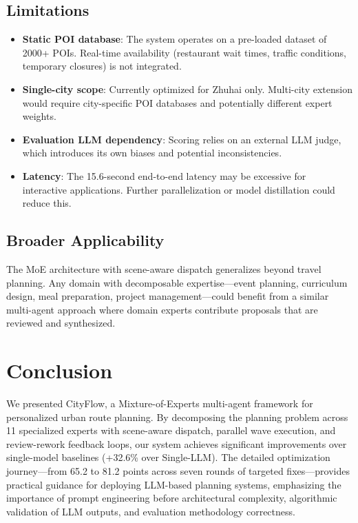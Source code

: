 \documentclass[11pt]{article}
\begin{document}
\subsection{Limitations}

\begin{itemize}[leftmargin=*]
    \item \textbf{Static POI database}: The system operates on a pre-loaded dataset of 2000+ POIs. Real-time availability (restaurant wait times, traffic conditions, temporary closures) is not integrated.
    \item \textbf{Single-city scope}: Currently optimized for Zhuhai only. Multi-city extension would require city-specific POI databases and potentially different expert weights.
    \item \textbf{Evaluation LLM dependency}: Scoring relies on an external LLM judge, which introduces its own biases and potential inconsistencies.
    \item \textbf{Latency}: The 15.6-second end-to-end latency may be excessive for interactive applications. Further parallelization or model distillation could reduce this.
\end{itemize}

\subsection{Broader Applicability}

The MoE architecture with scene-aware dispatch generalizes beyond travel planning. Any domain with decomposable expertise---event planning, curriculum design, meal preparation, project management---could benefit from a similar multi-agent approach where domain experts contribute proposals that are reviewed and synthesized.

\section{Conclusion}

We presented CityFlow, a Mixture-of-Experts multi-agent framework for personalized urban route planning. By decomposing the planning problem across 11 specialized experts with scene-aware dispatch, parallel wave execution, and review-rework feedback loops, our system achieves significant improvements over single-model baselines (+32.6\% over Single-LLM). The detailed optimization journey---from 65.2 to 81.2 points across seven rounds of targeted fixes---provides practical guidance for deploying LLM-based planning systems, emphasizing the importance of prompt engineering before architectural complexity, algorithmic validation of LLM outputs, and evaluation methodology correctness.
\end{document}
